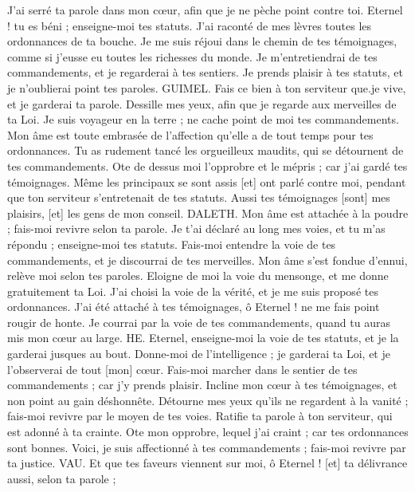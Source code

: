 \begin{multicols}{2}
J'ai serré ta parole dans mon cœur, afin que je ne pèche point contre toi.
Eternel ! tu es béni ; enseigne-moi tes statuts.
J'ai raconté de mes lèvres toutes les ordonnances de ta bouche.
Je me suis réjoui dans le chemin de tes témoignages, comme si j'eusse eu toutes les richesses du monde.
Je m'entretiendrai de tes commandements, et je regarderai à tes sentiers.
Je prends plaisir à tes statuts, et je n'oublierai point tes paroles.
GUIMEL. Fais ce bien à ton serviteur que.je vive, et je garderai ta parole.
Dessille mes yeux, afin que je regarde aux merveilles de ta Loi.
Je suis voyageur en la terre ; ne cache point de moi tes commandements.
Mon âme est toute embrasée de l'affection qu'elle a de tout temps pour tes ordonnances.
Tu as rudement tancé les orgueilleux maudits, qui se détournent de tes commandements.
Ote de dessus moi l'opprobre et le mépris ; car j'ai gardé tes témoignages.
Même les principaux se sont assis [et] ont parlé contre moi, pendant que ton serviteur s'entretenait de tes statuts.
Aussi tes témoignages [sont] mes plaisirs, [et] les gens de mon conseil.
DALETH. Mon âme est attachée à la poudre ; fais-moi revivre selon ta parole.
Je t'ai déclaré au long mes voies, et tu m'as répondu ; enseigne-moi tes statuts.
Fais-moi entendre la voie de tes commandements, et je discourrai de tes merveilles.
Mon âme s'est fondue d'ennui, relève moi selon tes paroles.
Eloigne de moi la voie du mensonge, et me donne gratuitement ta Loi.
J'ai choisi la voie de la vérité, et je me suis proposé tes ordonnances.
J'ai été attaché à tes témoignages, ô Eternel ! ne me fais point rougir de honte.
Je courrai par la voie de tes commandements, quand tu auras mis mon cœur au large.
HE. Eternel, enseigne-moi la voie de tes statuts, et je la garderai jusques au bout.
Donne-moi de l'intelligence ; je garderai ta Loi, et je l'observerai de tout [mon] cœur.
Fais-moi marcher dans le sentier de tes commandements ; car j'y prends plaisir.
Incline mon cœur à tes témoignages, et non point au gain déshonnête.
Détourne mes yeux qu'ils ne regardent à la vanité ; fais-moi revivre par le moyen de tes voies.
Ratifie ta parole à ton serviteur, qui est adonné à ta crainte.
Ote mon opprobre, lequel j'ai craint ; car tes ordonnances sont bonnes.
Voici, je suis affectionné à tes commandements ; fais-moi revivre par ta justice.
VAU. Et que tes faveurs viennent sur moi, ô Eternel ! [et] ta délivrance aussi, selon ta parole ;

\end{multicols}

